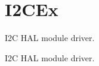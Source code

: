 \hypertarget{group___i2_c_ex}{}\section{I2\+C\+Ex}
\label{group___i2_c_ex}


I2C H\+AL module driver.  


I2C H\+AL module driver. 

